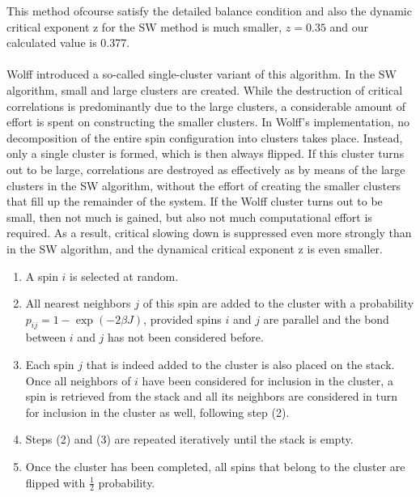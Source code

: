 \documentclass[a4paper,8pt]{article}
\begin{document}
This method ofcourse satisfy the detailed balance condition\supercite{SW} and also the dynamic
critical exponent z for the SW method is much smaller, $z = 0.35$ and our calculated value is 0.377. \\

\vspace{0.2cm}
 \\

Wolff\supercite{Wolff_algo} introduced a so-called single-cluster variant of this algorithm. In
the SW algorithm, small and large clusters are created. While the destruction of critical correlations is predominantly due to the large clusters, a considerable amount of effort is spent on constructing the smaller clusters. In Wolff’s implementation, no decomposition of the entire spin configuration into clusters takes place. Instead, only a single cluster is formed, which is then always flipped. If this cluster turns out to be large, correlations are destroyed as effectively
as by means of the large clusters in the SW algorithm, without the effort of creating the smaller clusters that fill up the remainder of the system. If the Wolff cluster turns out to be small, then not much is gained, but also not much computational effort is required. As a result, critical slowing down is suppressed even more strongly than in the SW algorithm, and the dynamical critical exponent z is even smaller.

\begin{enumerate}
    \item A spin $i$ is selected at random.
    \item All nearest neighbors $j$ of this spin are added to the cluster with a probability $p_{ij} = 1 - \exp(-2\beta J)$, provided spins $i$ and $j$ are parallel and the bond between $i$ and $j$ has not been considered before.
    \item Each spin $j$ that is indeed added to the cluster is also placed on the stack. Once all neighbors of $i$ have been considered for inclusion in the cluster, a spin is retrieved from the stack and all its neighbors are considered in turn for inclusion in the cluster as well, following step (2).
    \item Steps (2) and (3) are repeated iteratively until the stack is empty.
    \item Once the cluster has been completed, all spins that belong to the cluster are flipped with $\frac{1}{2}$ probability.
\end{enumerate}
\end{document}
